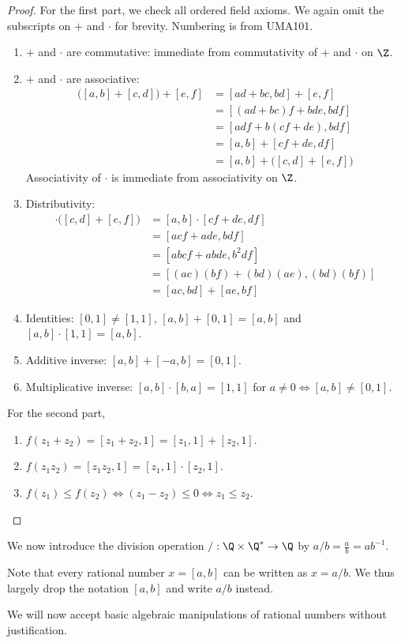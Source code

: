\begin{proof}
    For the first part, we check all ordered field axioms.
    We again omit the subscripts on $+$ and $\cdot$ for brevity.
    Numbering is from UMA101.
    \begin{enumerate}[label=\small(F\arabic*)]
        \item $+$ and $\cdot$ are commutative: immediate from commutativity of
        $+$ and $\cdot$ on $\Z$.
        \item $+$ and $\cdot$ are associative: \begin{align*}
            \big([a, b] + [c, d]\big) + [e, f]
                &= [ad + bc, bd] + [e, f] \\
                &= [(ad + bc)f + bde, bdf] \\
                &= [adf + b(cf + de), bdf] \\
                &= [a, b] + [cf + de, df] \\
                &= [a, b] + \big([c, d] + [e, f]\big)
        \end{align*}
        Associativity of $\cdot$ is immediate from associativity on $\Z$.
        \item Distributivity: \begin{align*}
            [a, b] \cdot \big([c, d] + [e, f]\big)
                &= [a, b] \cdot [cf + de, df] \\
                &= [acf + ade, bdf] \\
                &= [abcf + abde, b^2 df] \tag{$b$ is nonzero} \\
                &= [(ac)(bf) + (bd)(ae), (bd)(bf)] \\
                &= [ac, bd] + [ae, bf]
        \end{align*}
        \item Identities: $[0, 1] \ne [1, 1]$, $[a, b] + [0, 1] = [a, b]$ and
        $[a, b] \cdot [1, 1] = [a, b]$.
        \item Additive inverse: $[a, b] + [-a, b] = [0, 1]$.
        \item Multiplicative inverse: $[a, b] \cdot [b, a] = [1, 1]$ for
        $a \ne 0 \iff [a, b] \ne [0, 1]$.
    \end{enumerate}
    For the second part,
    \begin{enumerate}
        \item $f(z_1 + z_2) = [z_1 + z_2, 1] = [z_1, 1] + [z_2, 1]$.
        \item $f(z_1 z_2) = [z_1 z_2, 1] = [z_1, 1] \cdot [z_2, 1]$.
        \item $f(z_1) \le f(z_2) \iff (z_1 - z_2) \le 0 \iff z_1 \le z_2$.
        \qedhere
    \end{enumerate}
\end{proof}
We now introduce the division operation $/ : \Q \times \Q^* \to \Q$ by
$a/b = \frac{a}{b} = ab^{-1}$.
\begin{notation}
    Note that every rational number $x = [a, b]$ can be written as $x = a/b$.
    We thus largely drop the notation $[a, b]$ and write $a/b$ instead.
\end{notation}
We will now accept basic algebraic manipulations of rational numbers without
justification.
